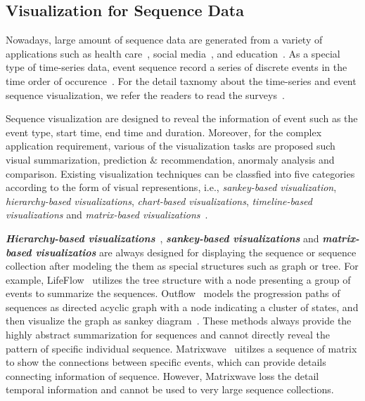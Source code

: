 \subsection{Visualization for Sequence Data}
Nowadays, large amount of sequence data are generated from a variety of applications such as health care~\cite{malik2015cohort, wongsuphasawat2011outflow}, social media~\cite{zhao2014fluxflow, law2018maqui}, and education~\cite{chen2015peakvizor, mu2019moocad, goulden2019ccvis, he2019vuc, chen2018viseq}.
As a special type of time-series data, event sequence record a series of discrete events in the time order of occurence~\cite{guo2020survey}. For the detail taxnomy about the time-series and event sequence visualization, we refer the readers to read the surveys~\cite{guo2020survey, silva2000visualization}. 

Sequence visualization are designed to reveal the information of event such as the event type, start time, end time and duration. Moreover, for the complex application requirement, various of the visualization tasks are proposed such visual summarization, prediction $\&$ recommendation, anormaly analysis and comparison. Existing visualization techniques can be classfied into five categories according to the form of visual representions, i.e., \emph{sankey-based visualization}, \emph{hierarchy-based visualizations}, \emph{chart-based visualizations}, \emph{timeline-based visualizations} and \emph{matrix-based visualizations}~\cite{guo2020survey}. 

\emph{\textbf{Hierarchy-based visualizations}}~\cite{gotz2019visual}, \emph{\textbf{sankey-based visualizations}} and \emph{\textbf{matrix-based visualizatios}} are always designed for displaying the sequence or sequence collection after modeling the them as special structures such as graph or tree.
For example, LifeFlow~\cite{wongsuphasawat2011lifeflow} utilizes the tree structure with a node presenting a group of events to summarize the sequences. Outflow~\cite{wongsuphasawat2011outflow} models the progression paths of sequences as directed acyclic graph with a node indicating a cluster of states, and then visualize the graph as sankey diagram~\cite{riehmann2005interactive}.  These methods always provide the highly abstract summarization for sequences and cannot directly reveal the pattern of specific individual sequence. Matrixwave~\cite{zhao2015matrixwave} uitilzes a sequence of matrix to show the connections between specific events, which can provide details connecting information of sequence. However, Matrixwave loss the detail temporal information and cannot be used to very large sequence collections. 

